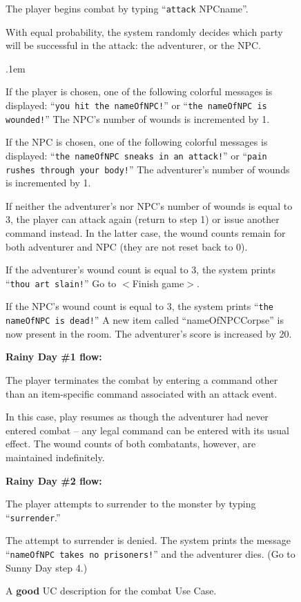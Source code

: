 \begin{figure}
\begin{center}
{{\begin{compactenum}
\item \textsf{The player begins combat by typing ``\texttt{attack} NPCname''.}
\item \textsf{With equal probability, the system randomly decides which party
will be successful in the attack: the adventurer, or the NPC.}
    \begin{compactitem}
    \itemsep.1em
    \item \textsf{If the player is chosen, one of the following colorful
messages is displayed: ``\texttt{you hit the nameOfNPC!}'' or ``\texttt{the
nameOfNPC is wounded!}'' The NPC's number of wounds is incremented by 1.}
    \item \textsf{If the NPC is chosen, one of the following colorful messages
is displayed: ``\texttt{the nameOfNPC sneaks in an attack!}'' or
``\texttt{pain rushes through your body!}'' The adventurer's number of wounds
is incremented by 1.}
    \end{compactitem}
\item \textsf{If neither the adventurer's nor NPC's number of wounds is equal
to 3, the player can attack again (return to step 1) or issue another command
instead. In the latter case, the wound counts remain for both adventurer and
NPC (they are not reset back to 0).}
\item \textsf{If the adventurer's wound count is equal to 3, the system prints
``\texttt{thou art slain!}'' Go to $<$Finish game$>$.}
\item \textsf{If the NPC's wound count is equal to 3, the system prints
``\texttt{the nameOfNPC is dead!}'' A new item called ``nameOfNPCCorpse'' is
now present in the
room. The adventurer's score is increased by 20.}
\end{compactenum}
\vspace{.05in}
\textsf{\textbf{Rainy Day \#1 flow:}}
\begin{compactenum}
\item \textsf{The player terminates the combat by entering a command other
than an item-specific command associated with an attack event.}
\item \textsf{In this case, play resumes as though the adventurer had never
entered combat -- any legal command can be entered with its usual effect. The
wound counts of both combatants, however, are maintained indefinitely.}
\end{compactenum}
\textsf{\textbf{Rainy Day \#2 flow:}}
\begin{compactenum}
\item \textsf{The player attempts to surrender to the monster by typing
``\texttt{surrender}.''}
\item \textsf{The attempt to surrender is denied. The system prints the
message ``\texttt{nameOfNPC takes no prisoners!}'' and the adventurer dies.
(Go to Sunny Day step 4.)}
\end{compactenum}
}}
\end{center}
\caption{A \textbf{good} UC description for the combat Use Case.}
\label{fig:duelUCGood}
\end{figure}

